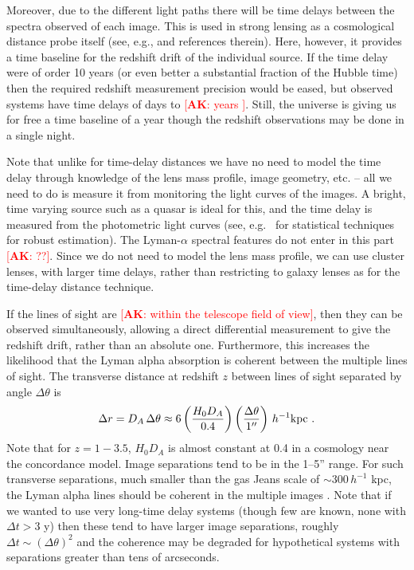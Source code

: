 \documentclass[preprint2, 10pt]{aastex}
\newcommand{\be}{\begin{equation}}
\newcommand{\ee}{\end{equation}}
\newcommand{\alex}[1]{\textcolor{red}{[{\bf AK}: #1]}}
\begin{document}
Moreover, due to the different light paths there will be time delays 
between the spectra observed of each image.  This is used in strong 
lensing as a cosmological distance probe itself (see, e.g., \citet{13061272} 
and references therein).  Here, however, it provides a time baseline for 
the redshift drift of the individual source.  If the time delay were of 
order 10 years (or even better a substantial fraction of the Hubble time) 
then the required redshift measurement precision would be eased, but 
observed systems have time delays of days to \alex{years
\citep{2007ApJ...662...62F,2008ApJ...676..761F, 2013ApJ...764..186F}}.  Still, the universe 
is giving us for free a time baseline of a year though the redshift 
observations may be done in a single night.  

Note that unlike for time-delay distances 
we have no need to model the time delay through knowledge of the lens mass 
profile, image geometry, etc. -- all we need to do is measure it from 
monitoring the light curves of the images.  A bright, time varying source 
such as a quasar is ideal for this, and the time delay is measured from 
the photometric light curves (see, e.g.\ \citet{tewes,hkl} for statistical 
techniques for 
robust estimation).  The Lyman-$\alpha$ spectral features do not enter in 
this part \alex{??}.  Since we do not need to model the lens mass profile, we can 
use cluster lenses, with larger time delays, rather than restricting to 
galaxy lenses as for the time-delay distance technique. 

If the lines of sight are \alex{within the telescope field of view}, then they can be 
observed simultaneously, allowing a direct differential measurement to give 
the redshift drift, rather than an absolute one.  Furthermore, this increases 
the likelihood that the Lyman alpha absorption is coherent between the 
multiple lines of sight.  The transverse distance at redshift $z$ between 
lines of sight separated by angle $\Delta\theta$ is 
\be 
\Delta r=D_A\,\Delta\theta\approx 
6\left(\frac{H_0D_A}{0.4}\right)\left(\frac{\Delta\theta}{1''}\right)\, 
h^{-1}{\rm kpc} \ . 
\ee 
Note that for $z=1-3.5$, $H_0D_A$ is almost constant at 0.4 in a 
cosmology near the concordance model.  Image separations tend to be in 
the 1--5'' range.  For such transverse separations, much smaller than 
the gas Jeans scale of $\sim300\,h^{-1}$ kpc, the Lyman alpha lines 
should be coherent in the multiple images \citep{09100250}.  
Note that if we wanted to 
use very long-time delay systems (though few are known, none with 
$\Delta t>3$ y) then these tend to have larger image separations, roughly 
$\Delta t\sim(\Delta\theta)^2$ and the coherence may be degraded for 
hypothetical systems with separations greater than tens of arcseconds. 
\end{document}

